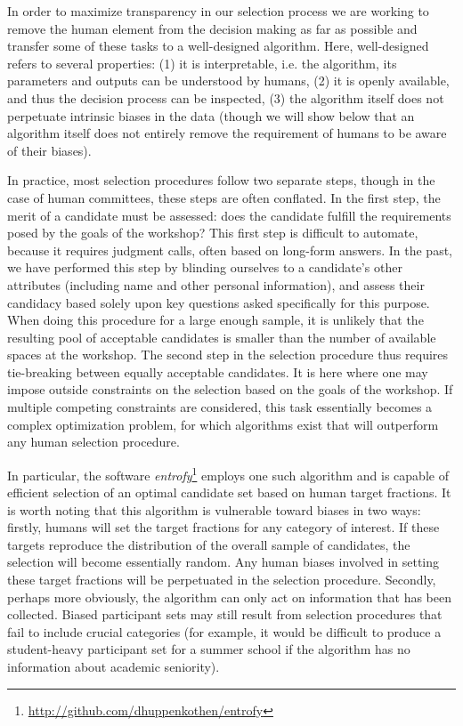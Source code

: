In order to maximize transparency in our selection process we are working to remove the human element from the decision making as far as possible and transfer some of these tasks to a well-designed algorithm.
Here, well-designed refers to several properties: (1) it is interpretable, i.e. the algorithm, its parameters and outputs can be understood by humans, (2) it is openly available, and thus the decision process can be inspected, (3) the algorithm itself does not perpetuate intrinsic biases in the data (though we will show below that an algorithm itself does not entirely remove the requirement of humans to be aware of their biases).

In practice, most selection procedures follow two separate steps, though in the case of human committees, these steps are often conflated.
In the first step, the merit of a candidate must be assessed: does the candidate fulfill the requirements posed by the goals of the workshop? %
This first step is difficult to automate, because it requires judgment calls, often based on long-form answers.
In the past, we have performed this step by blinding ourselves to a candidate's other attributes (including name and other personal information), and assess their candidacy based solely upon key questions asked specifically for this purpose.
When doing this procedure for a large enough sample, it is unlikely that the resulting pool of acceptable candidates is smaller than the number of available spaces at the workshop.
The second step in the selection procedure thus requires tie-breaking between equally acceptable candidates.
It is here where one may impose outside constraints on the selection based on the goals of the workshop.
If multiple competing constraints are considered, this task essentially becomes a complex optimization problem, for which algorithms exist that will outperform any human selection procedure.

In particular, the software \textit{entrofy}\footnote{\url{http://github.com/dhuppenkothen/entrofy}} employs one such algorithm and is capable of efficient selection of an optimal candidate set based on human target fractions.
It is worth noting that this algorithm is vulnerable toward biases in two ways: firstly, humans will set the target fractions for any category of interest.
If these targets reproduce the distribution of the overall sample of candidates, the selection will become essentially random.
Any human biases involved in setting these target fractions will be perpetuated in the selection procedure.
Secondly, perhaps more obviously, the algorithm can only act on information that has been collected.
Biased participant sets may still result from selection procedures that fail to include crucial categories (for example, it would be difficult to produce a student-heavy participant set for a summer school if the algorithm has no information about academic seniority).


